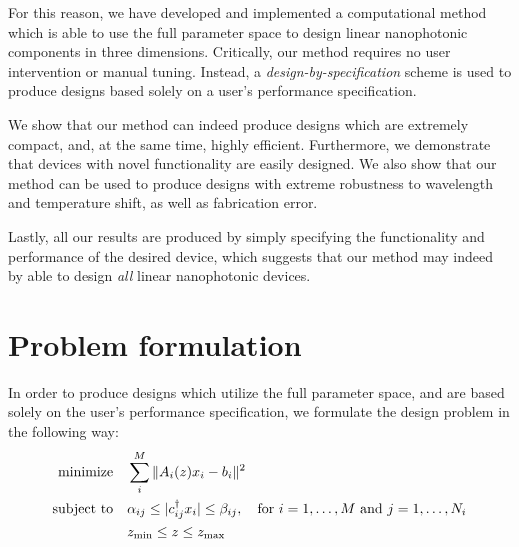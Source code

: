\documentclass[letterpaper,10pt]{article}
\begin{document}
For this reason, we have developed and implemented a computational method
    which is able to use the full parameter space 
    to design linear nanophotonic components in three dimensions.
Critically, our method requires no user intervention or manual tuning.
Instead, a \emph{design-by-specification} scheme is used 
    to produce designs based solely on a user's performance specification.

We show that our method can indeed produce designs 
    which are extremely compact, and, at the same time, highly efficient.
Furthermore, we demonstrate that devices with novel functionality
    are easily designed.
We also show that our method can be used to produce designs
    with extreme robustness to wavelength and temperature shift,
    as well as fabrication error.

Lastly, all our results are produced by simply specifying
    the functionality and performance of the desired device,
    which suggests that our method may indeed by able
    to design \emph{all} linear nanophotonic devices.

\section{Problem formulation}
In order to produce designs which utilize the full parameter space,
    and are based solely on the user's performance specification,
    we formulate the design problem in the following way:
\begin{subequations}\begin{align}
    \operatorname*{\text{minimize}\quad} & \sum_i^M \|A_i(z)x_i - b_i\|^2 \\
    \text{subject to}\quad & \alpha_{ij} \le |c_{ij}^\dagger x_i| \le \beta_{ij}, \quad
        \text{for $i = 1, \ldots, M$ and $j = 1, \ldots, N_i$} \\
        &   z_\text{min} \le z \le z_\text{max}
\end{align} \label{problem}\end{subequations}
\end{document}
